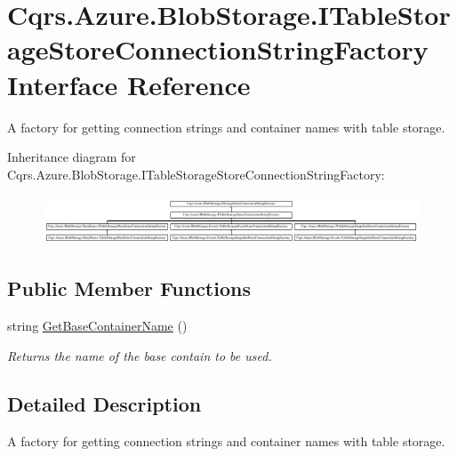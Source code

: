 \hypertarget{interfaceCqrs_1_1Azure_1_1BlobStorage_1_1ITableStorageStoreConnectionStringFactory}{}\section{Cqrs.\+Azure.\+Blob\+Storage.\+I\+Table\+Storage\+Store\+Connection\+String\+Factory Interface Reference}
\label{interfaceCqrs_1_1Azure_1_1BlobStorage_1_1ITableStorageStoreConnectionStringFactory}


A factory for getting connection strings and container names with table storage.  


Inheritance diagram for Cqrs.\+Azure.\+Blob\+Storage.\+I\+Table\+Storage\+Store\+Connection\+String\+Factory\+:\begin{figure}[H]
\begin{center}
\leavevmode
\includegraphics[height=1.487384cm]{interfaceCqrs_1_1Azure_1_1BlobStorage_1_1ITableStorageStoreConnectionStringFactory}
\end{center}
\end{figure}
\subsection*{Public Member Functions}
\begin{DoxyCompactItemize}
\item 
string \hyperlink{interfaceCqrs_1_1Azure_1_1BlobStorage_1_1ITableStorageStoreConnectionStringFactory_a1b9bfc9dcb7292e62619fc46e4a85982_a1b9bfc9dcb7292e62619fc46e4a85982}{Get\+Base\+Container\+Name} ()
\begin{DoxyCompactList}\small\item\em Returns the name of the base contain to be used. \end{DoxyCompactList}\end{DoxyCompactItemize}


\subsection{Detailed Description}
A factory for getting connection strings and container names with table storage. 




